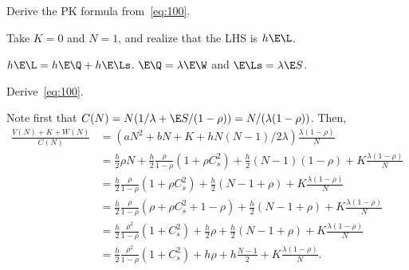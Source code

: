\begin{exercise}\label{ex:69}
Derive the PK formula from~\cref{eq:100}.
\begin{hint}
Take  $K=0$ and $N=1$, and realize that the LHS is $h\E \L$.
\end{hint}
\begin{solution}
$h\E \L = h \E\Q + h \E\Ls$. $\E \Q = \lambda \E\W$ and $\E \Ls = \lambda \E S$.
\end{solution}
\end{exercise}


\begin{exercise}\label{ex:n-mg3}
Derive~\cref{eq:100}.
\begin{solution}
  Note first that $C(N) = N(1/\lambda + \E S / (1-\rho)) = N/(\lambda(1-\rho))$. Then,
  \begin{align*}
    \frac{V(N) + K + W(N)}{C(N)}
    &= \left(aN^2 + bN + K + h N(N-1)/2 \lambda\right) \frac{\lambda(1-\rho)}N \\
    &= \frac h 2 \rho N  + \frac h 2 \frac \rho{1-\rho} (1+\rho C_s^2) + \frac h 2 (N-1)(1-\rho) + K \frac{\lambda(1-\rho)}N \\
    &= \frac h 2 \frac \rho{1-\rho} (1+\rho C_s^2) + \frac h 2 (N-1 + \rho) + K \frac{\lambda(1-\rho)}N \\
    &= \frac h 2 \frac \rho{1-\rho} (\rho + \rho C_s^2 + 1 - \rho) + \frac h 2 (N-1 + \rho) + K \frac{\lambda(1-\rho)}N \\
    &= \frac h 2 \frac{\rho^2}{1-\rho} (1+ C_s^2) +\frac h 2 \rho + \frac h 2 (N-1 + \rho) + K \frac{\lambda(1-\rho)}N \\
    &= \frac h 2 \frac{\rho^2}{1-\rho} (1+ C_s^2) + h \rho + h \frac{N-1}2 + K \frac{\lambda(1-\rho)}N.
  \end{align*}
\end{solution}
\end{exercise}



